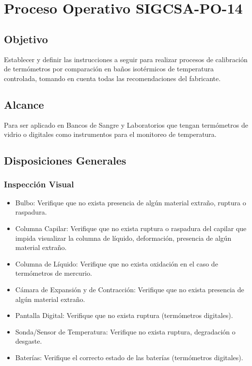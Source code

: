 \section{Proceso Operativo SIGCSA-PO-14}
\subsection{Objetivo}
\par 

	Establecer y definir las instrucciones a seguir para realizar procesos de calibración de termómetros
	por comparación en baños isotérmicos de temperatura controlada, tomando en cuenta todas las
	recomendaciones del fabricante.
	
\subsection{Alcance}
\par 
	Para ser aplicado en Bancos de Sangre y Laboratorios que tengan termómetros de vidrio o digitales
	como instrumentos para el monitoreo de temperatura.
	
\subsection{Disposiciones Generales}
\subsubsection{Inspección Visual}

\begin{itemize}
	\item Bulbo: Verifique que no exista presencia de algún material extraño, ruptura o
	raspadura.
	
	\item Columna Capilar: Verifique que no exista ruptura o raspadura del capilar que
	impida visualizar la columna de líquido, deformación, presencia de algún material
	extraño.
	
	\item Columna de Líquido: Verifique que no exista oxidación en el caso de termómetros
	de mercurio.
	
	\item Cámara de Expansión y de Contracción: Verifique que no exista presencia de algún
	material extraño.
	
	\item Pantalla Digital: Verifique que no exista ruptura (termómetros digitales).
	
	\item Sonda/Sensor de Temperatura: Verifique no exista ruptura, degradación o
	desgaste.
	
	\item Baterías: Verifique el correcto estado de las baterías (termómetros digitales).
\end{itemize}
		

